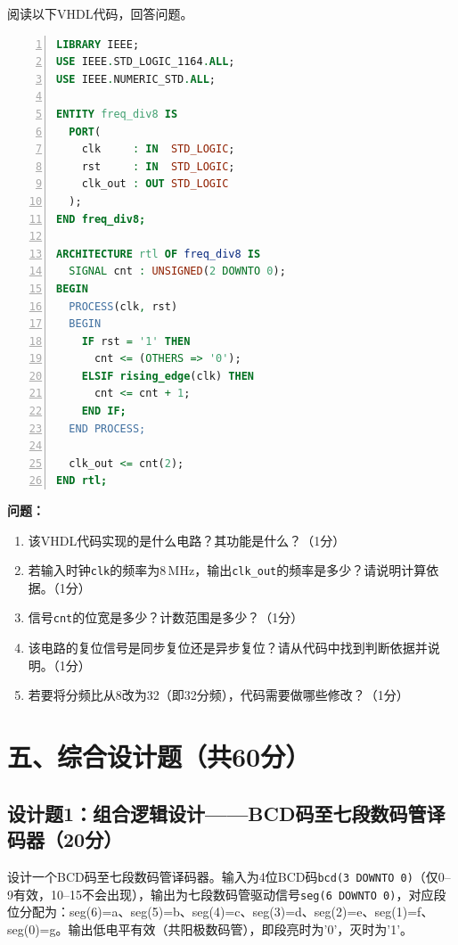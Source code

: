 阅读以下VHDL代码，回答问题。

\begin{lstlisting}[language=VHDL, numbers=left, caption={分析用VHDL代码}]
LIBRARY IEEE;
USE IEEE.STD_LOGIC_1164.ALL;
USE IEEE.NUMERIC_STD.ALL;

ENTITY freq_div8 IS
  PORT(
    clk     : IN  STD_LOGIC;
    rst     : IN  STD_LOGIC;
    clk_out : OUT STD_LOGIC
  );
END freq_div8;

ARCHITECTURE rtl OF freq_div8 IS
  SIGNAL cnt : UNSIGNED(2 DOWNTO 0);
BEGIN
  PROCESS(clk, rst)
  BEGIN
    IF rst = '1' THEN
      cnt <= (OTHERS => '0');
    ELSIF rising_edge(clk) THEN
      cnt <= cnt + 1;
    END IF;
  END PROCESS;

  clk_out <= cnt(2);
END rtl;
\end{lstlisting}

\begin{framed}
\textbf{问题：}
\begin{enumerate}[label=(\arabic*)]
  \item 该VHDL代码实现的是什么电路？其功能是什么？（1分）
  \item 若输入时钟\verb|clk|的频率为8\,MHz，输出\verb|clk_out|的频率是多少？请说明计算依据。（1分）
  \item 信号\verb|cnt|的位宽是多少？计数范围是多少？（1分）
  \item 该电路的复位信号是同步复位还是异步复位？请从代码中找到判断依据并说明。（1分）
  \item 若要将分频比从8改为32（即32分频），代码需要做哪些修改？（1分）
\end{enumerate}
\end{framed}

\newpage

\section*{五、综合设计题（共60分）}

\subsection*{设计题1：组合逻辑设计——BCD码至七段数码管译码器（20分）}

设计一个BCD码至七段数码管译码器。输入为4位BCD码\verb|bcd(3 DOWNTO 0)|（仅0--9有效，10--15不会出现），输出为七段数码管驱动信号\verb|seg(6 DOWNTO 0)|，对应段位分配为：seg(6)=a、seg(5)=b、seg(4)=c、seg(3)=d、seg(2)=e、seg(1)=f、seg(0)=g。输出低电平有效（共阳极数码管），即段亮时为'0'，灭时为'1'。


